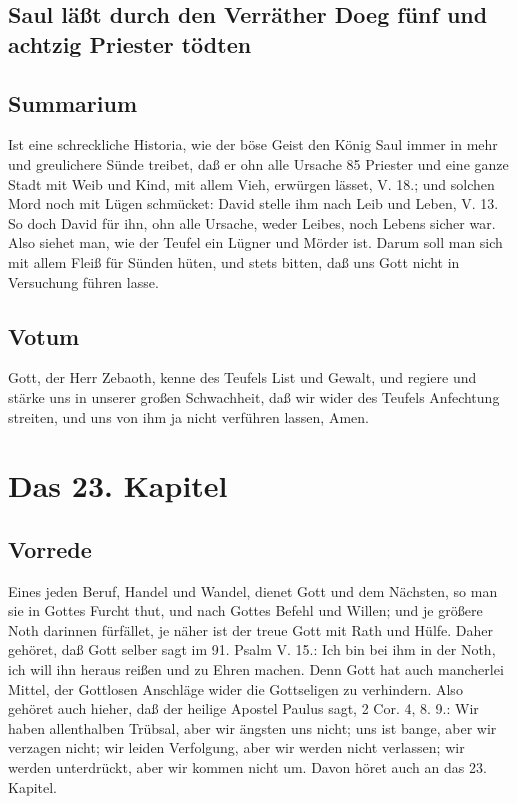 \section[Saul läßt durch den Verräther Doeg fünf und]{Saul läßt durch den Verräther Doeg fünf und achtzig Priester tödten}

\section{Summarium}

Ist eine schreckliche Historia, wie der böse Geist den König Saul immer in mehr und greulichere Sünde treibet, daß er ohn alle Ursache 85 Priester und eine ganze Stadt mit Weib und Kind, mit allem Vieh, erwürgen lässet, V. 18.; und solchen Mord noch mit Lügen schmücket: David stelle ihm nach Leib und Leben, V. 13. So doch David für ihn, ohn alle Ursache, weder Leibes, noch Lebens sicher war. Also siehet man, wie der Teufel ein Lügner und Mörder ist. Darum soll man sich mit allem Fleiß für
Sünden hüten, und stets bitten, daß uns Gott nicht in Versuchung führen lasse.

\section{Votum}

Gott, der Herr Zebaoth, kenne des Teufels List und Gewalt, und regiere und stärke uns in unserer großen Schwachheit, daß wir wider des Teufels Anfechtung streiten, und uns von ihm ja nicht verführen lassen, Amen.

\chapter{Das 23. Kapitel}

\section{Vorrede}

Eines jeden Beruf, Handel und Wandel, dienet Gott und dem Nächsten, so man sie in Gottes Furcht thut, und nach Gottes Befehl und Willen; und je größere Noth darinnen fürfället, je näher ist der treue Gott mit Rath und Hülfe. Daher gehöret, daß Gott selber sagt im 91. Psalm V. 15.: Ich bin bei ihm in der Noth, ich will ihn heraus reißen und zu Ehren machen. Denn Gott hat auch mancherlei Mittel, der Gottlosen Anschläge wider die Gottseligen zu verhindern. Also gehöret auch hieher, daß der heilige Apostel Paulus sagt, 2 Cor. 4, 8. 9.: Wir haben allenthalben Trübsal, aber wir ängsten uns nicht; uns ist bange, aber wir verzagen nicht; wir leiden Verfolgung, aber wir werden nicht verlassen; wir werden unterdrückt, aber wir kommen nicht um. Davon höret auch an das 23. Kapitel.

